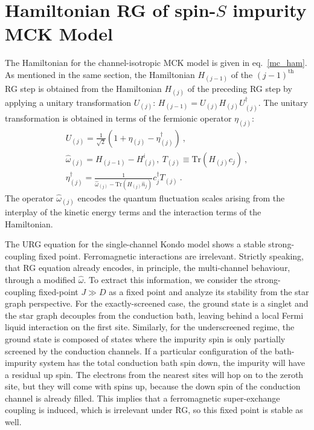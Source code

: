 \documentclass[reprint,prb,superscriptaddress]{revtex4-2}
\begin{document}
\appendix
\section{Hamiltonian RG of spin-\(S\) impurity MCK Model}
\label{appendix_urg}
The Hamiltonian for the channel-isotropic MCK model is given in eq.~\ref{mc_ham}. As mentioned in the same section, the Hamiltonian \(H_{(j-1)}\) of the \((j-1)^\text{th}\) RG step is obtained from the Hamiltonian \(H_{(j)}\) of the preceding RG step by applying a unitary transformation \(U_{(j)}\): \(H_{(j-1)} = U_{(j)} H_{(j)} U^\dagger_{(j)}\). The unitary transformation is obtained in terms of the fermionic operator \(\eta_{(j)}\):
\begin{gather}
	U_{(j)} = \frac{1}{\sqrt 2}\left(1 + \eta_{(j)} - \eta_{(j)}^\dagger\right)~, \\
	\hat \omega_{(j)} = H_{(j-1)} - H^i_{(j)},~T_{(j)} \equiv \text{Tr}\left(H_{(j)}c_{j}\right)~,\\
	\eta^\dagger_{(j)} = \frac{1}{\hat \omega_{(j)} - \text{Tr}\left(H_{(j)} \hat n_{j}\right) } c^\dagger_{j} T_{(j)}~.
\end{gather}
The operator \(\hat \omega_{(j)}\) encodes the quantum fluctuation scales arising from the interplay of the kinetic energy terms and the interaction terms of the Hamiltonian.

The URG equation for the single-channel Kondo model \cite{kondo_urg} shows a stable strong-coupling fixed point. Ferromagnetic interactions are irrelevant. Strictly speaking, that RG equation already encodes, in principle, the multi-channel behaviour, through a modified \(\hat \omega\). To extract this information, we consider the strong-coupling fixed-point \(J \gg D\) as a fixed point and analyze its stability from the star graph perspective. For the exactly-screened case, the ground state is a singlet and the star graph decouples from the conduction bath, leaving behind a local Fermi liquid interaction on the first site. Similarly, for the underscreened regime, the ground state is composed of states where the impurity spin is only partially screened by the conduction channels. If a particular configuration of the bath-impurity system has the total conduction bath spin down, the impurity will have a residual up spin. The electrons from the nearest sites will hop on to the zeroth site, but they will come with spins up, because the down spin of the conduction channel is already filled. This implies that a ferromagnetic super-exchange coupling is induced, which is irrelevant under RG, so this fixed point is stable as well. 
\end{document}
